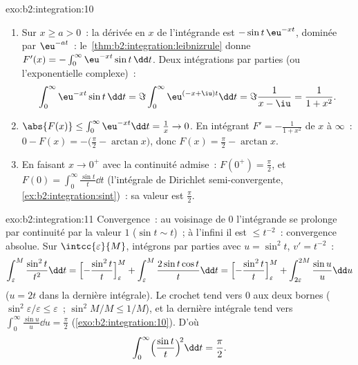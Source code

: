 \begin{solution}{exo:b2:integration:10}
\begin{enumerate}
  \item Sur $x \geq a > 0$~: la dérivée en $x$ de l'intégrande est
        $-\sin t\,\eu^{-xt}$, dominée par $\eu^{-at}$~:
        le~\cref{thm:b2:integration:leibnizrule} donne $F'(x) =
        -\int_0^\infty \eu^{-xt}\sin t\,\dd t$. Deux intégrations par
        parties (ou l'exponentielle complexe)~:
        \[
        \int_0^\infty \eu^{-xt}\sin t\,\dd t
        = \Im \int_0^\infty \eu^{(-x+\iu)t}\dd t
        = \Im\frac{1}{x - \iu} = \frac{1}{1 + x^2} .
        \]
  \item $\abs{F(x)} \leq \int_0^\infty \eu^{-xt}\dd t = \frac1x \to
        0$. En intégrant $F' = -\frac{1}{1+x^2}$ de $x$ à
        $\infty$~: $0 - F(x) = -\bigl(\frac\pi2 - \arctan x\bigr)$,
        donc $F(x) = \frac\pi2 - \arctan x$.
  \item En faisant $x \to 0^+$ avec la continuité admise~: $F(0^+) =
        \frac\pi2$, et $F(0) = \int_0^\infty \frac{\sin t}{t}\dd
        t$ (l'intégrale de Dirichlet semi-convergente,
        \cref{ex:b2:integration:sint})~: sa valeur est
        $\frac\pi2$.
\end{enumerate}
\end{solution}

\begin{solution}{exo:b2:integration:11}
Convergence~: au voisinage de $0$ l'intégrande se prolonge par continuité par la
valeur $1$ ($\sin t \sim t$)~; à l'infini il est $\leq t^{-2}$~:
convergence absolue. Sur $\intcc{\varepsilon}{M}$, intégrons par
parties avec $u = \sin^2 t$, $v' = t^{-2}$~:
\[
\int_\varepsilon^M \frac{\sin^2 t}{t^2}\dd t
= \Bigl[-\frac{\sin^2 t}{t}\Bigr]_\varepsilon^M
+ \int_\varepsilon^M \frac{2\sin t\cos t}{t}\dd t
= \Bigl[-\frac{\sin^2 t}{t}\Bigr]_\varepsilon^M
+ \int_{2\varepsilon}^{2M} \frac{\sin u}{u}\dd u
\]
($u = 2t$ dans la dernière intégrale). Le crochet tend vers $0$ aux deux
bornes ($\sin^2\varepsilon/\varepsilon \leq \varepsilon$~;
$\sin^2 M/M \leq 1/M$), et la dernière intégrale tend vers
$\int_0^\infty \frac{\sin u}{u}\dd u = \frac\pi2$
(\cref{exo:b2:integration:10}). D'où
\[
\int_0^\infty \Bigl(\frac{\sin t}{t}\Bigr)^{\!2}\dd t
= \frac\pi2 .
\]
\end{solution}

